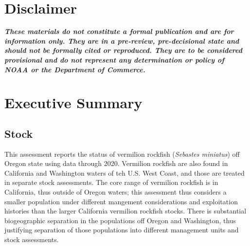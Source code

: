 \documentclass[11pt,
  english,
  a4paper,
]{article}
\begin{document}
\newcommand{\lt}{\ensuremath <}
\newcommand{\gt}{\ensuremath >}

\vspace{500cm}


\hypertarget{disclaimer}{%
\section*{Disclaimer}\label{disclaimer}}

\leavevmode\tagmcend\tagstructend


\emph{\textbf{These materials do not constitute a formal publication and are for information only. They are in a pre-review, pre-decisional state and should not be formally cited or reproduced. They are to be considered provisional and do not represent any determination or policy of NOAA or the Department of Commerce.}}

\leavevmode\tagmcend\tagstructend\par

\pagebreak
{}
\setcounter{page}{1}

\renewcommand{\thetable}{\roman{table}}
\renewcommand{\thefigure}{\roman{figure}}

\setlength\parskip{0.5em plus 0.1em minus 0.2em}


\hypertarget{executive-summary}{%
\section*{Executive Summary}\label{executive-summary}}

\leavevmode\tagmcend\tagstructend


\hypertarget{stock}{%
\subsection*{Stock}\label{stock}}

\leavevmode\tagmcend\tagstructend


This assessment reports the status of vermilion rockfish (\emph{Sebastes miniatus}) off Oregon state using data through 2020. Vermilion rockfish are also found in California and Washington waters of teh U.S. West Coast, and those are treated in separate stock assessments. The core range of vermilion rockfish is in California, thus outside of Oregon waters; this assessment thus considers a smaller population under different mangement considerations and exploitation histories than the larger California vermilion rockfish stocks. There is substantial biogeographic separation in the populations off Oregon and Washington, thus justifying separation of those populations into different management units and stock assessments.
\end{document}
